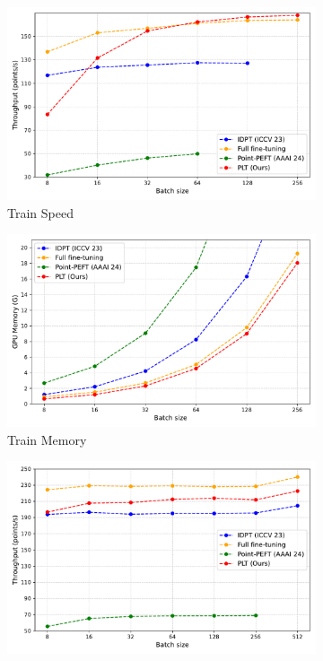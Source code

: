 \begin{figure}
    \centering
    \begin{subfigure}{0.46\textwidth}
        \centering
        \includegraphics[width=\linewidth]{fig/supplement/performance/train_speed.pdf}
        \caption{Train Speed}
        \label{fig:per1}
    \end{subfigure}
    \hfill
    \begin{subfigure}{0.46\textwidth}
        \centering
        \includegraphics[width=\linewidth]{fig/supplement/performance/train_memory.pdf}
        \caption{Train Memory}
        \label{fig:per2}
    \end{subfigure}
    \hfill
    \begin{subfigure}{0.46\textwidth}
        \centering
        \includegraphics[width=\linewidth]{fig/supplement/performance/infer_speed.pdf}

\end{subfigure}
\end{figure}
